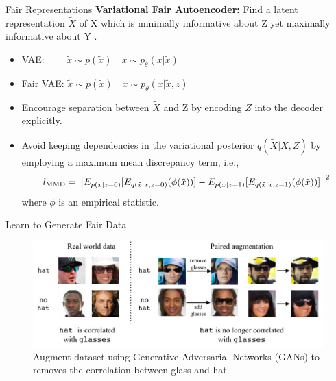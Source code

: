 \documentclass[10pt, xcolor=table,aspectratio=169]{beamer}
\begin{document}
\begin{frame}{Fair Representations}
	\textbf{Variational Fair Autoencoder:} Find a latent representation $\tilde{X}$
	of X which is minimally informative about Z yet maximally informative
	about Y \cite{louizos2015variational}.
	\begin{itemize}
		\item VAE: $\quad \quad \tilde{x} \sim p(\tilde{x}) \quad x\sim p_\theta(x|\tilde{x})$
		\item Fair VAE: $\tilde{x}\sim p(\tilde{x}) \quad x\sim p_\theta(x|\tilde{x},z)$
		\item Encourage separation between $\tilde{X}$ and Z by  encoding $Z$ into the decoder explicitly.
		\item Avoid keeping dependencies in the variational posterior $q(\tilde{X}|X,Z)$ by employing a maximum mean discrepancy term, i.e.,
		      \[l_{\text{MMD}}=\left\|E_{p(x|z=0)}[E_{q(\tilde{x}|x,z=0)}(\phi(\tilde{x}))]-E_{p(x|z=1)}[E_{q(\tilde{x}|x,z=1)}(\phi(\tilde{x}))]\right\|^2\]
		      where $\phi $ is an empirical statistic.
	\end{itemize}


\end{frame}

\begin{frame}{Learn to Generate Fair Data}
	\begin{figure}[t]
		\begin{center}
			\includegraphics[width=0.8\columnwidth]{./figs/hat_gan.png}
		\end{center}
		\caption{Augment dataset using Generative Adversarial Networks (GANs) to removes the correlation between glass and hat. \cite{ramaswamy2021fair}}
	\end{figure}


\end{frame}
\end{document}
